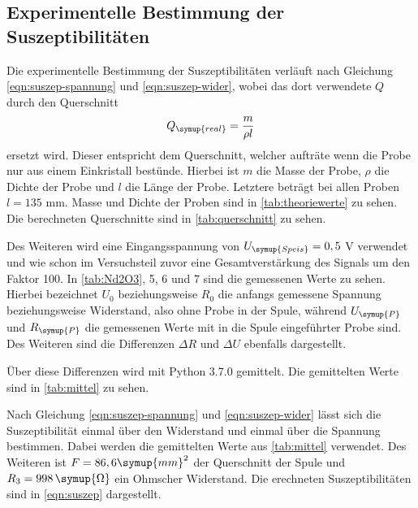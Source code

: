     \subsection{Experimentelle Bestimmung der Suszeptibilitäten}
    Die experimentelle Bestimmung der Suszeptibilitäten verläuft nach Gleichung \eqref{eqn:suszep-spannung} und \eqref{eqn:suszep-wider},
    wobei das dort verwendete $Q$ durch den Querschnitt
    \begin{equation}
    \label{eqn:qreal}
    Q_{\symup{real}} = \frac{m}{\rho l}
    \end{equation}
    ersetzt wird. Dieser entspricht dem Querschnitt, welcher aufträte wenn die Probe nur aus einem Einkristall bestünde.
    Hierbei ist $m$ die Masse der Probe, $\rho$ die Dichte der Probe und $l$ die Länge der Probe. Letztere beträgt bei allen 
    Proben $l = 135$ mm. Masse und Dichte der Proben sind in \autoref{tab:theoriewerte} zu sehen.
    Die berechneten Querschnitte sind in \autoref{tab:querschnitt} zu sehen.
    
    Des Weiteren wird eine Eingangsspannung von $U_{\symup{Speis}} = 0,5$ V verwendet und wie schon im Versuchsteil zuvor eine Gesamtverstärkung
    des Signals um den Faktor 100. In \autoref{tab:Nd2O3}, 5, 6 und 7 sind die gemessenen
    Werte zu sehen. Hierbei bezeichnet $U_0$ beziehungsweise $R_0$ die anfangs gemessene Spannung beziehungsweise Widerstand, also ohne
    Probe in der Spule, während $U_{\symup{P}}$ und $R_{\symup{P}}$ die gemessenen Werte mit in die Spule eingeführter Probe sind. Des
    Weiteren sind die Differenzen $\Delta R$ und $\Delta U$ ebenfalls dargestellt.
    
    
    
    
    Über diese Differenzen wird mit Python 3.7.0 gemittelt. Die gemittelten Werte sind in \autoref{tab:mittel} zu sehen.
    
    Nach Gleichung \eqref{eqn:suszep-spannung} und \eqref{eqn:suszep-wider} lässt sich die Suszeptibilität einmal über den Widerstand und 
    einmal über die Spannung bestimmen. Dabei werden die gemittelten Werte aus \autoref{tab:mittel} verwendet.
    Des Weiteren ist $F = 86,6 \symup{mm}^2$ der Querschnitt der Spule und $R_3 = 998 \, \symup{ \Omega}$ ein Ohmscher Widerstand.
    Die erechneten Suszeptibilitäten sind in \autoref{eqn:suszep} dargestellt.
    